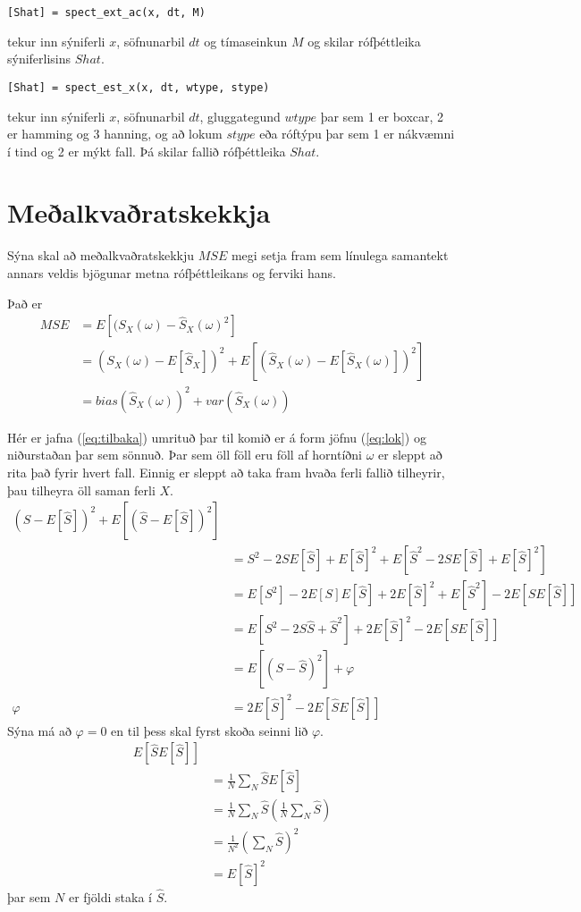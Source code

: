 \documentclass[11pt,a4paper]{article}
\begin{document}
\begin{verbatim}
[Shat] = spect_ext_ac(x, dt, M)
\end{verbatim}
tekur inn sýniferli $x$, söfnunarbil $dt$ og tímaseinkun $M$ og skilar
rófþéttleika sýniferlisins $Shat$.

\begin{verbatim}
[Shat] = spect_est_x(x, dt, wtype, stype)
\end{verbatim}
tekur inn sýniferli $x$, söfnunarbil $dt$, gluggategund $wtype$ þar 
sem 1 er boxcar, 2 er hamming og 3 hanning, og að lokum $stype$ 
eða róftýpu þar sem 1 er nákvæmni í tind og 2 er mýkt fall. Þá skilar
fallið rófþéttleika $Shat$.
\section{Meðalkvaðratskekkja} \label{se:mse}
Sýna skal að meðalkvaðratskekkju $MSE$ megi setja fram sem línulega
samantekt annars veldis bjögunar metna rófþéttleikans og ferviki hans.

Það er 
\begin{align}
    MSE &= E[(S_X(\omega)-\hat{S}_X(\omega)^2] \label{eq:lok}\\
    &= (S_X(\omega)-E[\hat{S}_X])^2+E[(\hat{S}_X(\omega)-
    E[\hat{S}_X(\omega)])^2] \label{eq:tilbaka} \\
    &= bias(\hat{S}_X(\omega))^2+var(\hat{S}_X(\omega))
\end{align}

Hér er jafna (\ref{eq:tilbaka}) umrituð þar til komið er á form
jöfnu (\ref{eq:lok}) og niðurstaðan þar sem sönnuð. Þar sem öll föll eru 
föll af horntíðni $\omega$ er sleppt að rita það fyrir hvert fall.
Einnig er sleppt að taka fram hvaða ferli fallið tilheyrir, þau 
tilheyra öll saman ferli $X$.
\begin{align*}
    (S-E[\hat{S}])^2 + E[(\hat{S}-E[\hat{S}])^2] \\
    &= S^2 - 2SE[\hat{S}]+E[\hat{S}]^2
    + E[\hat{S}^2-2\hat{S}E[\hat{S}]+E[\hat{S}]^{2}] \\
    &= E[S^2]-2E[S]E[\hat{S}] +2E[\hat{S}]^2 
    +E[\hat{S}^2]-2E[\hat{S}E[\hat{S}]] \\
    &= E[S^2-2S\hat{S}+\hat{S}^2]+2E[\hat{S}]^2-2E[\hat{S}E[\hat{S}]] \\
    &= E[(S-\hat{S})^2] + \varphi \\
    \varphi &= 2E[\hat{S}]^2-2E[\hat{S}E[\hat{S}]]
\end{align*}
Sýna má að $\varphi=0$ en til þess skal fyrst skoða seinni lið $\varphi$.
\begin{align*}
    E[\hat{S}E[\hat{S}]] \\
    &= \frac{1}{N}\sum_N \hat{S} E[\hat{S}] \\
    &= \frac{1}{N}\sum_N \hat{S} 
    \left(\frac{1}{N} \sum_N \hat{S}\right) \\
    &= \frac{1}{N^2}\left(\sum_N \hat{S} \right) ^{2} \\
    &= E[\hat{S}]^2
\end{align*}
þar sem $N$ er fjöldi staka í $\hat{S}$.
\end{document}
